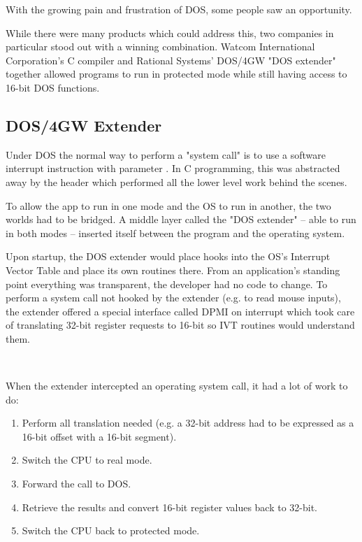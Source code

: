 \par
With the growing pain and frustration of DOS, some people saw an opportunity.\newpage 

While there were many products which could address this, two companies in particular stood out with a winning combination. Watcom International Corporation's C compiler and Rational Systems' DOS/4GW "DOS extender" together allowed programs to run in protected mode while still having access to 16-bit DOS functions.\\
\par


\subsection{DOS/4GW Extender}
Under DOS the normal way to perform a "system call" is to use a software interrupt instruction with parameter . In C programming, this was abstracted away by the header  which performed all the lower level work behind the scenes.\\
\par
{}
To allow the app to run in one mode and the OS to run in another, the two worlds had to be bridged. A middle layer called the "DOS extender" -- able to run in both modes -- inserted itself between the program and the operating system.\\

\par
{}
Upon startup, the DOS extender would place hooks into the OS's Interrupt Vector Table and place its own routines there. From an application's standing point everything was transparent, the developer had no code to change. To perform a system call not hooked by the extender (e.g.  to read mouse inputs), the extender offered a special interface called DPMI on interrupt  which took care of translating 32-bit register requests to 16-bit so IVT routines would understand them.\\
\par
{}\\
\par
When the extender intercepted an operating system call, it had a lot of work to do:
\begin{enumerate}
\item Perform all translation needed (e.g. a 32-bit address had to be expressed as a 16-bit offset with a 16-bit segment).
\item Switch the CPU to real mode.
\item Forward the call to DOS.
\item Retrieve the results and convert 16-bit register values back to 32-bit.
\item Switch the CPU back to protected mode.
\end{enumerate} 

